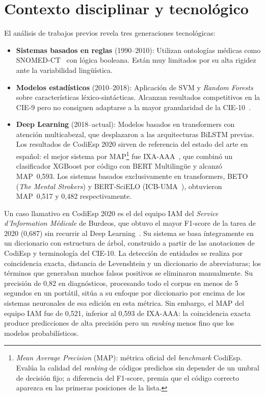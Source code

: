 \section{Contexto disciplinar y tecnológico}

El análisis de trabajos previos revela tres generaciones tecnológicas:

\begin{itemize}
    \item \textbf{Sistemas basados en reglas} (1990--2010): Utilizan ontologías médicas como SNOMED-CT~\cite{stearns2001snomedct} con lógica booleana. Están muy limitados por su alta rigidez ante la variabilidad lingüística.
    \item \textbf{Modelos estadísticos} (2010--2018): Aplicación de SVM y \emph{Random Forests} sobre características léxico-sintácticas. Alcanzan resultados competitivos en la CIE-9 pero no consiguen adaptarse a la mayor granularidad de la CIE-10~\cite{perotte2014}.
    \item \textbf{Deep Learning} (2018--actual): Modelos basados en transformers con atención multicabezal, que desplazaron a las arquitecturas BiLSTM previas. Los resultados de CodiEsp 2020 sirven de referencia del estado del arte en español: el mejor sistema por MAP\footnote{\emph{Mean Average Precision} (MAP): métrica oficial del \emph{benchmark} CodiEsp. Evalúa la calidad del \emph{ranking} de códigos predichos sin depender de un umbral de decisión fijo; a diferencia del F1-score, premia que el código correcto aparezca en las primeras posiciones de la lista.} fue IXA-AAA~\cite{miranda2020}, que combinó un clasificador XGBoost por código con BERT Multilingüe y alcanzó MAP~0,593. Los sistemas basados exclusivamente en transformers, BETO (\emph{The Mental Strokers}) y BERT-SciELO (ICB-UMA~\cite{lopezgarcia2020icb}), obtuvieron MAP~0,517 y 0,482 respectivamente.
\end{itemize}

Un caso llamativo en CodiEsp 2020 es el del equipo IAM del \emph{Service d'Information Médicale} de Burdeos, que obtuvo el mayor F1-score de la tarea de 2020 (0,687) sin recurrir al Deep Learning~\cite{cossin2020}. Su sistema se basa íntegramente en un diccionario con estructura de árbol, construido a partir de las anotaciones de CodiEsp y terminología del CIE-10. La detección de entidades se realiza por coincidencia exacta, distancia de Levenshtein y un diccionario de abreviaturas; los términos que generaban muchos falsos positivos se eliminaron manualmente. Su precisión de 0,82 en diagnósticos, procesando todo el corpus en menos de 5 segundos en un portátil, sitúa a su enfoque por diccionario por encima de los sistemas neuronales de esa edición en esta métrica. Sin embargo, el MAP del equipo IAM fue de 0,521, inferior al 0,593 de IXA-AAA: la coincidencia exacta produce predicciones de alta precisión pero un \emph{ranking} menos fino que los modelos probabilísticos.

